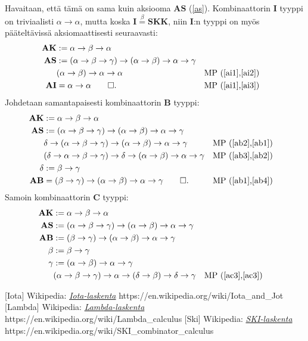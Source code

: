 \documentclass[a4paper,12pt]{amsart}
\begin{document}
Havaitaan, että tämä on sama kuin aksiooma $\mathbf{AS}$ (\ref{as}). Kombinaattorin $\mathbf{I}$ tyyppi on triviaalisti $\alpha\to\alpha$, mutta koska $\mathbf{I}\stackrel{\beta}{=}\mathbf{SKK}$, niin $\mathbf{I}$:n tyyppi on myös pääteltävissä aksiomaattisesti seuraavasti:
\begin{align}
\mathbf{AK} &:= \alpha\to\beta\to\alpha \label{ai1} \\
\mathbf{AS} &:= (\alpha\to\beta\to\gamma)\to(\alpha\to\beta)\to\alpha\to\gamma \label{ai2} \\
& (\alpha\to\beta)\to\alpha\to\alpha && \text{MP (\ref{ai1},\ref{ai2})} \label{ai3} \\
\mathbf{AI} &= \alpha\to\alpha\qed. && \text{MP (\ref{ai1},\ref{ai3})}
\end{align}
Johdetaan samantapaisesti kombinaattorin $\mathbf{B}$ tyyppi:
\begin{align}
\mathbf{AK} &:= \alpha\to\beta\to\alpha \label{ab1} \\
\mathbf{AS} &:= (\alpha\to\beta\to\gamma)\to(\alpha\to\beta)\to\alpha\to\gamma \label{ab2} \\
& \delta\to(\alpha\to\beta\to\gamma)\to(\alpha\to\beta)\to\alpha\to\gamma && \text{MP (\ref{ab2},\ref{ab1})} \label{ab3} \\
& (\delta\to\alpha\to\beta\to\gamma)\to\delta\to(\alpha\to\beta)\to\alpha\to\gamma && \text{MP (\ref{ab3},\ref{ab2})} \label{ab4} \\
\delta &:= \beta\to\gamma \\
\mathbf{AB} &= (\beta\to\gamma)\to(\alpha\to\beta)\to\alpha\to\gamma\qed. && \text{MP (\ref{ab1},\ref{ab4})}
\end{align}
Samoin kombinaattorin $\mathbf{C}$ tyyppi:
\begin{align}
\mathbf{AK} &:= \alpha\to\beta\to\alpha \label{ac1} \\
\mathbf{AS} &:= (\alpha\to\beta\to\gamma)\to(\alpha\to\beta)\to\alpha\to\gamma \label{ac2} \\
\mathbf{AB} &:= (\beta\to\gamma)\to(\alpha\to\beta)\to\alpha\to\gamma \label{ac3} \\
\beta &:= \beta\to\gamma \\
\gamma &:= (\alpha\to\beta)\to\alpha\to\gamma \\
& (\alpha\to\beta\to\gamma)\to\alpha\to(\delta\to\beta)\to\delta\to\gamma && \text{MP (\ref{ac3},\ref{ac3})} \label{ac4} \\
\end{align}

\begin{thebibliography}{99}
[Iota] Wikipedia: \href{https://en.wikipedia.org/wiki/Iota\_and\_Jot}{\emph{Iota-laskenta}}
https://en.wikipedia.org/wiki/Iota\_and\_Jot
[Lambda] Wikipedia: \href{https://en.wikipedia.org/wiki/Lambda\_calculus}{\emph{Lambda-laskenta}} https://en.wikipedia.org/wiki/Lambda\_calculus
[Ski] Wikipedia: \href{https://en.wikipedia.org/wiki/SKI\_combinator\_calculus}{\emph{SKI-laskenta}} https://en.wikipedia.org/wiki/SKI\_combinator\_calculus
\end{thebibliography}
\end{document}
